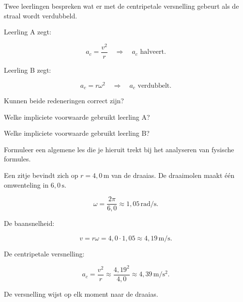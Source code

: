 \documentclass{ximera}
\begin{document}
\begin{oefening}{\oefG}

Twee leerlingen bespreken wat er met de centripetale versnelling gebeurt
als de straal wordt verdubbeld.

Leerling A zegt:

\[
a_c=\frac{v^2}{r}
\quad\Rightarrow\quad
a_c\text{ halveert.}
\]

Leerling B zegt:

\[
a_c=r\omega^2
\quad\Rightarrow\quad
a_c\text{ verdubbelt.}
\]

\begin{question}
Kunnen beide redeneringen correct zijn?
\end{question}

\begin{question}
Welke impliciete voorwaarde gebruikt leerling A?
\end{question}

\begin{question}
Welke impliciete voorwaarde gebruikt leerling B?
\end{question}

\begin{question}
Formuleer een algemene les die je hieruit trekt bij het analyseren van
fysische formules.
\end{question}

\end{oefening}




\begin{voorbeeld}

Een zitje bevindt zich op $r=4,0\,\mathrm{m}$ van de draaias. De
draaimolen maakt één omwenteling in $6,0\,\mathrm{s}$.

\[
\omega
=
\frac{2\pi}{6,0}
\approx1,05\,\mathrm{rad/s}.
\]

De baansnelheid:

\[
v=r\omega
=
4,0\cdot1,05
\approx4,19\,\mathrm{m/s}.
\]

De centripetale versnelling:

\[
a_c
=
\frac{v^2}{r}
\approx
\frac{4,19^2}{4,0}
\approx4,39\,\mathrm{m/s^2}.
\]

De versnelling wijst op elk moment naar de draaias.

\end{voorbeeld}
\end{document}
